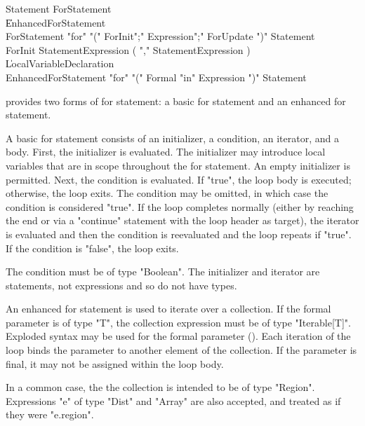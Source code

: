
\begin{grammar}
Statement \: ForStatement \\
          \| EnhancedForStatement \\
ForStatement \: \xcd"for" \xcd"("
        ForInit\opt \xcd";" Expression\opt \xcd";" ForUpdate\opt
        \xcd")" Statement \\
ForInit \:
        StatementExpression ( \xcd"," StatementExpression )\star
        \\
      \| LocalVariableDeclaration \\
EnhancedForStatement \: \xcd"for" \xcd"("
        Formal \xcd"in" Expression 
        \xcd")" Statement \\
\end{grammar}

\Xten{} provides two forms of for statement: a basic for
statement and an enhanced for statement.

A basic for statement consists of an initializer, a condition, an
iterator, and a body.  First, the initializer is evaluated.
The initializer may introduce local variables that are in scope
throughout the for statement.  An empty initializer is
permitted.
Next, the condition is evaluated.  If \xcd"true", the loop body
is executed; otherwise, the loop exits.
The condition may be omitted, in which case the condition is
considered \xcd"true".
If the loop completes normally (either by reaching the end
or via a \xcd"continue" statement with the loop header as
target),
the iterator is evaluated and then the condition is reevaluated
and the loop repeats if
\xcd"true".  If the condition is \xcd"false", the loop
exits.

The condition must be of type \xcd"Boolean".
The initializer and iterator are statements, not expressions
and so do not have types.

\label{ForAllLoop}


An enhanced for statement is used to iterate over a collection.
If the formal parameter is of type \xcd"T",
the collection expression must be of type \xcd"Iterable[T]".
Exploded
syntax may
be used for the formal parameter ().
Each iteration of the loop
binds the parameter to another element of the collection.
If the parameter is final, it may not be assigned within the
loop body.

In a common case, the
the collection is intended to be of type
\xcd"Region".  Expressions \xcd"e" of type \xcd"Dist" and
\xcd"Array" are also accepted, and treated as if they were
\xcd"e.region".

